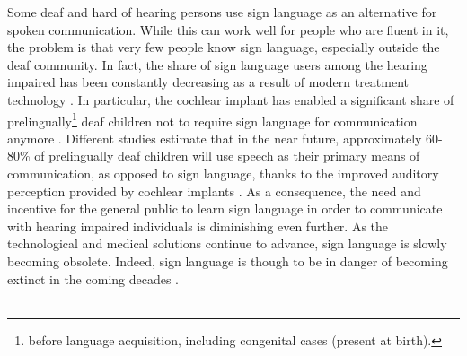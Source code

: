 \documentclass[english, 12pt, a4paper, pdftex, elec, utf8]{aaltothesis}
\begin{document}
Some deaf and hard of hearing persons use sign language as an alternative for spoken communication. While this can work well for people who are fluent in it, the problem is that very few people know sign language, especially outside the deaf community. In fact, the share of sign language users among the hearing impaired has been constantly decreasing as a result of modern treatment technology \cite{stacey2006hearing, raino2012sisakorvaistutteen}. In particular, the cochlear implant has enabled a significant share of prelingually\footnote{before language acquisition, including congenital cases (present at birth).} deaf children not to require sign language for communication anymore \cite{moore2007cochlear, peterson2010cochlear}. Different studies estimate that in the near future, approximately 60-80\% of prelingually deaf children will use speech as their primary means of communication, as opposed to sign language, thanks to the improved auditory perception provided by cochlear implants \cite{raino2012sisakorvaistutteen}. As a consequence, the need and incentive for the general public to learn sign language in order to communicate with hearing impaired individuals is diminishing even further. As the technological and medical solutions continue to advance, sign language is slowly becoming obsolete. Indeed, sign language is though to be in danger of becoming extinct in the coming decades \cite{raino2012sisakorvaistutteen}. \\\\
\end{document}
